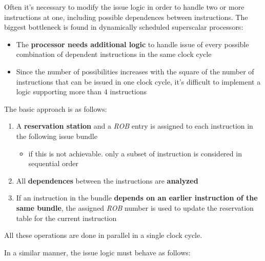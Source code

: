 \documentclass[english]{article}
\begin{document}
Often it's necessary to modify the issue logic in order to handle two or more instructions at one, including possible dependences between instructions.
The biggest bottleneck is found in dynamically scheduled superscalar processors:

\begin{itemize}
  \item The \textbf{processor needs additional logic} to handle issue of every possible combination of dependent instructions in the same clock cycle
  \item Since the number of possibilities increases with the square of the number of instructions that can be issued in one clock cycle, it's difficult to implement a logic supporting more than \(4\) instructions
\end{itemize}

\bigskip
The basic approach is as follows:

\begin{enumerate}
  \item A \textbf{reservation station} and a \textit{ROB} entry is assigned to each instruction in the following issue bundle
        \begin{itemize}
          \item if this is not achievable. only a subset of instruction is considered in sequential order
        \end{itemize}
  \item All \textbf{dependences} between the instructions are \textbf{analyzed}
  \item If an instruction in the bundle \textbf{depends on an earlier instruction of the same bundle}, the assigned \textit{ROB} number is used to update the reservation table for the current instruction
\end{enumerate}

All these operations are done in parallel in a single clock cycle.

In a similar manner, the issue logic must behave as follows:
\end{document}
